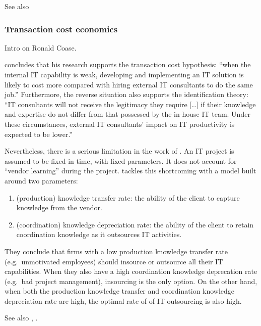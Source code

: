 \documentclass[12pt]{article}
\providecommand{\tightlist}{%
  \setlength{\itemsep}{0pt}\setlength{\parskip}{0pt}}
\begin{document}
See also \citep[ 66]{armbruster2006}

\hypertarget{transaction-cost-economics}{%
\subsubsection{Transaction cost
economics}\label{transaction-cost-economics}}

Intro on Ronald Coase.

\citet[16-17]{nevo2007} concludes that his research supports the
transaction cost hypothesis: ``when the internal IT capability is weak,
developing and implementing an IT solution is likely to cost more
compared with hiring external IT consultants to do the same job.''
Furthermore, the reverse situation also supports the identification
theory: ``IT consultants will not receive the legitimacy they require
{[}\ldots{]} if their knowledge and expertise do not differ from that
possessed by the in-house IT team. Under these circumstances, external
IT consultants' impact on IT productivity is expected to be lower.''

Nevertheless, there is a serious limitation in the work of
\citet{nevo2007}. An IT project is assumed to be fixed in time, with
fixed parameters. It does not account for ``vendor learning''
\citep{wu2004} during the project. \citet{cha2009} tackles this
shortcoming with a model built around two parameters:

\begin{enumerate}
\def\labelenumi{\arabic{enumi}.}
\tightlist
\item
  (production) knowledge transfer rate: the ability of the client to
  capture knowledge from the vendor.
\item
  (coordination) knowledge depreciation rate: the ability of the client
  to retain coordination knowledge as it outsources IT activities.
\end{enumerate}

They conclude that firms with a low production knowledge transfer rate
(e.g.~unmotivated employees) should insource or outsource all their IT
capabilities. When they also have a high coordination knowledge
deprecation rate (e.g.~bad project management), insourcing is the only
option. On the other hand, when both the production knowledge transfer
and coordination knowledge depreciation rate are high, the optimal rate
of of IT outsourcing is also high.

See also \citep[ 12-14]{armbruster2006}, \citep{canback1999}.
\end{document}
